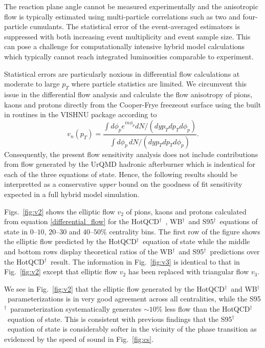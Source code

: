 \documentclass[aps,prc,reprint,amsmath,nofootinbib,superscriptaddress]{revtex4-1}
\newcommand{\hotqcd}{HotQCD$^\dagger$~}
\newcommand{\wb}{WB$^\dagger$~}
\newcommand{\spv}{S95$^\dagger$~}
\begin{document}
The reaction plane angle cannot be measured experimentally and the anisotropic flow is typically estimated using multi-particle correlations such as two and four-particle cumulants. The statistical error of the 
event-averaged estimators is suppressed with both increasing event multiplicity and event sample size. This can pose a challenge for computationally intensive hybrid model calculations which typically cannot 
reach integrated luminosities comparable to experiment. 

Statistical errors are particularly noxious in differential flow calculations at moderate to large $p_T$ where particle statistics are limited. We circumvent this issue in the differential flow 
analysis and calculate the flow anisotropy of pions, kaons and protons directly from the Cooper-Frye freezeout surface using the built in routines in the VISHNU package according to
\begin{equation}
 \label{differential_flow}
 v_n(p_T) = \frac{\int d\phi_p e^{i n \phi_p} dN/(dy p_T dp_T d\phi_p)}{\int d\phi_p\, dN/(dy p_T dp_T d\phi_p)}.
\end{equation}
Consequently, the present flow sensitivity analysis does not include contributions from flow generated by the UrQMD hadronic afterburner which is indentical for each of the three equations of state. Hence, the following
results should be interpretted as a conservative \emph{upper} bound on the goodness of fit sensitivity expected in a full hybrid model simulation.

Figs.~\ref{fig:v2} shows the elliptic flow $v_2$ of pions, kaons and protons calculated from equation \eqref{differential_flow} for the \hotqcd, \wb and \spv equations of state in $0$--$10$, $20$--$30$ and $40$--$50\%$ centrality bins. 
The first row of the figure shows the elliptic flow predicted by the \hotqcd equation of state while the middle and bottom rows display theoretical ratios of the \wb and \spv predictions over the \hotqcd result. The information
in Fig.~\ref{fig:v3} is identical to that in Fig.~\ref{fig:v2} except that elliptic flow $v_2$ has been replaced with triangular flow $v_3$.

We see in Fig.~\ref{fig:v2} that the elliptic flow generated by the \hotqcd and \wb parameterizations is in very good agreement across all centralities, while the \spv parameterization systematically generates $\sim 10\%$ less 
flow than the \hotqcd equation of state. This is consistent with previous findings that the \spv equation of state is considerably softer in the vicinity of the phase transition as evidenced by the 
speed of sound in Fig.~\ref{fig:cs}. 
\end{document}
